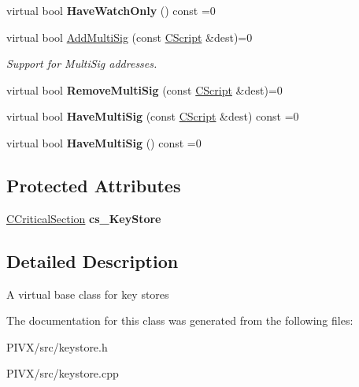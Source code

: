 \begin{DoxyCompactItemize}
virtual bool {\bfseries Have\+Watch\+Only} () const =0
\item 
\mbox{\label{class_c_key_store_ab6af86a2277fbbe26f86d63ea38b511c}} 
virtual bool \mbox{\hyperlink{class_c_key_store_ab6af86a2277fbbe26f86d63ea38b511c}{Add\+Multi\+Sig}} (const \mbox{\hyperlink{class_c_script}{C\+Script}} \&dest)=0
\begin{DoxyCompactList}\small\item\em Support for Multi\+Sig addresses. \end{DoxyCompactList}\item 
\mbox{\label{class_c_key_store_abfdfe8c320151c251b312111058d8918}} 
virtual bool {\bfseries Remove\+Multi\+Sig} (const \mbox{\hyperlink{class_c_script}{C\+Script}} \&dest)=0
\item 
\mbox{\label{class_c_key_store_a260556f6f2aecfe317a2bfa4aed5d855}} 
virtual bool {\bfseries Have\+Multi\+Sig} (const \mbox{\hyperlink{class_c_script}{C\+Script}} \&dest) const =0
\item 
\mbox{\label{class_c_key_store_a0b1218c4094352920a7bfe84f70d1a63}} 
virtual bool {\bfseries Have\+Multi\+Sig} () const =0
\end{DoxyCompactItemize}
\subsection*{Protected Attributes}
\begin{DoxyCompactItemize}
\item 
\mbox{\label{class_c_key_store_a386524ff4a00959b81c195cb39fe307d}} 
\mbox{\hyperlink{class_annotated_mixin}{C\+Critical\+Section}} {\bfseries cs\+\_\+\+Key\+Store}
\end{DoxyCompactItemize}


\subsection{Detailed Description}
A virtual base class for key stores 

The documentation for this class was generated from the following files\+:\begin{DoxyCompactItemize}
\item 
P\+I\+V\+X/src/keystore.\+h\item 
P\+I\+V\+X/src/keystore.\+cpp\end{DoxyCompactItemize}

